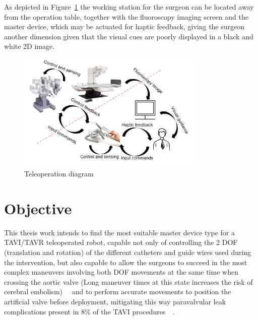 As depicted in Figure~\ref{img:teleoperation} the working station for the surgeon can be located away from the operation table, together with the fluoroscopy imaging screen and the master device, which may be actuated for haptic feedback, giving the surgeon another dimension given that the visual cues are poorly displayed in a black and white 2D image.\\

\begin{figure}[ht]
   \centering
   \includegraphics[width=0.8\textwidth]{img/teleoperation.PNG}
   \caption{Teleoperation diagram}
   \label{img:teleoperation}
\end{figure}

\section{Objective}\label{sec:objective}

This thesis work intends to find the most suitable master device type for a TAVI/TAVR teleoperated robot, capable not only of controlling the 2 DOF (translation and rotation) of the different catheters and guide wires used during the intervention, but also capable to allow the surgeons to succeed in the most complex maneuvers involving both DOF movements at the same time when crossing the aortic valve (Long maneuver times at this state increases the risk of cerebral embolism)~\cite{raptech}~\cite{anatomic} and to perform accurate movements to position the artificial valve before deployment, mitigating this way paravalvular leak complications present in 8\% of the TAVI procedures~\cite{pvl}~\cite{pvl2}.\\

